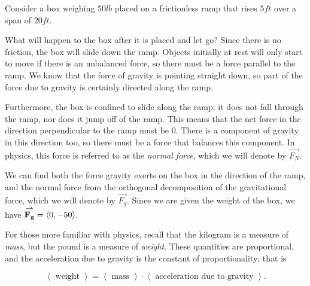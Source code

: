\documentclass{ximera}
\begin{document}
\begin{example}
  Consider a box weighing $50\unit{lb}$ placed on a frictionless ramp that rises
  $5\unit{ft}$ over a span of $20\unit{ft}$.
  \begin{image}
  \end{image}
  
What will happen to the box after it is placed and let go?  Since there is no friction, the box will slide down the ramp.  Objects initially at rest will only start to move if there is an unbalanced force, so there must be a force parallel to the ramp.  We know that the force of gravity is pointing straight down, so part of the force due to gravity is certainly directed along the ramp.  
  
Furthermore, the box is confined to slide along the ramp; it does not fall through the ramp, nor does it jump off of the ramp.  This means that the net force in the direction perpendicular to the ramp must be $0$.  There is a component of gravity in this direction too, so there must be a force that balances this component.  In physics, this force is referred to as the \emph{normal force}, which we will denote by $\vec{F_N}$.  

We can find both the force gravity exerts on the box in the direction of the ramp, and the normal force from the orthogonal decomposition of the gravitational force, which we will denote by $\vec{F_g}$.  Since we are given the weight of the box, we have ${\overset{\boldsymbol{\rightharpoonup}}{\mathbf{F_g}}} =   \left\langle 0,-50\right\rangle$.

\begin{remark}
For those more familiar with physics, recall that the kilogram is a measure of \emph{mass}, but the pound is a measure of \emph{weight}.  These quantities are proportional, and the acceleration due to gravity is the constant of proportionality; that is 

\[
\left<\textrm{ weight }\right> = \left< \textrm{ mass }\right> \cdot \left<\textrm{ acceleration due to gravity } \right>.
\]


\end{remark}
\end{example}
\end{document}
